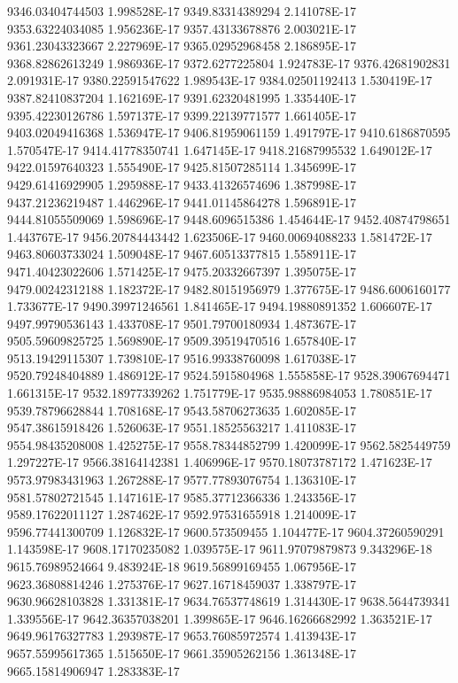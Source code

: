 9346.03404744503  1.998528E-17
9349.83314389294  2.141078E-17
9353.63224034085  1.956236E-17
9357.43133678876  2.003021E-17
9361.23043323667  2.227969E-17
9365.02952968458  2.186895E-17
9368.82862613249  1.986936E-17
9372.6277225804  1.924783E-17
9376.42681902831  2.091931E-17
9380.22591547622  1.989543E-17
9384.02501192413  1.530419E-17
9387.82410837204  1.162169E-17
9391.62320481995  1.335440E-17
9395.42230126786  1.597137E-17
9399.22139771577  1.661405E-17
9403.02049416368  1.536947E-17
9406.81959061159  1.491797E-17
9410.6186870595  1.570547E-17
9414.41778350741  1.647145E-17
9418.21687995532  1.649012E-17
9422.01597640323  1.555490E-17
9425.81507285114  1.345699E-17
9429.61416929905  1.295988E-17
9433.41326574696  1.387998E-17
9437.21236219487  1.446296E-17
9441.01145864278  1.596891E-17
9444.81055509069  1.598696E-17
9448.6096515386  1.454644E-17
9452.40874798651  1.443767E-17
9456.20784443442  1.623506E-17
9460.00694088233  1.581472E-17
9463.80603733024  1.509048E-17
9467.60513377815  1.558911E-17
9471.40423022606  1.571425E-17
9475.20332667397  1.395075E-17
9479.00242312188  1.182372E-17
9482.80151956979  1.377675E-17
9486.6006160177  1.733677E-17
9490.39971246561  1.841465E-17
9494.19880891352  1.606607E-17
9497.99790536143  1.433708E-17
9501.79700180934  1.487367E-17
9505.59609825725  1.569890E-17
9509.39519470516  1.657840E-17
9513.19429115307  1.739810E-17
9516.99338760098  1.617038E-17
9520.79248404889  1.486912E-17
9524.5915804968  1.555858E-17
9528.39067694471  1.661315E-17
9532.18977339262  1.751779E-17
9535.98886984053  1.780851E-17
9539.78796628844  1.708168E-17
9543.58706273635  1.602085E-17
9547.38615918426  1.526063E-17
9551.18525563217  1.411083E-17
9554.98435208008  1.425275E-17
9558.78344852799  1.420099E-17
9562.5825449759  1.297227E-17
9566.38164142381  1.406996E-17
9570.18073787172  1.471623E-17
9573.97983431963  1.267288E-17
9577.77893076754  1.136310E-17
9581.57802721545  1.147161E-17
9585.37712366336  1.243356E-17
9589.17622011127  1.287462E-17
9592.97531655918  1.214009E-17
9596.77441300709  1.126832E-17
9600.573509455  1.104477E-17
9604.37260590291  1.143598E-17
9608.17170235082  1.039575E-17
9611.97079879873  9.343296E-18
9615.76989524664  9.483924E-18
9619.56899169455  1.067956E-17
9623.36808814246  1.275376E-17
9627.16718459037  1.338797E-17
9630.96628103828  1.331381E-17
9634.76537748619  1.314430E-17
9638.5644739341  1.339556E-17
9642.36357038201  1.399865E-17
9646.16266682992  1.363521E-17
9649.96176327783  1.293987E-17
9653.76085972574  1.413943E-17
9657.55995617365  1.515650E-17
9661.35905262156  1.361348E-17
9665.15814906947  1.283383E-17
